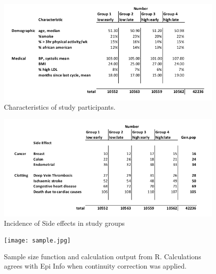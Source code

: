 \documentclass[11pt]{article}
\begin{document}
\begin{figure}[h!]
	\centering
	\includegraphics[scale=0.6]{table1.jpg}
	\caption{Characteristics of study participants.}
	\label{table1}
\end{figure}
 
\begin{figure}[h!]
	\centering
	\includegraphics[scale=0.7]{table2.jpg}
	\caption{Incidence of Side effects in study groups}
	\label{table2}
\end{figure}

\begin{figure}[h!]
	\centering
	\texttt{[image: sample.jpg]}
	\caption{Sample size function and calculation output from R. Calculations agrees with Epi Info when continuity correction was applied.}
	\label{sample}
\end{figure}

\clearpage


\end{document}
